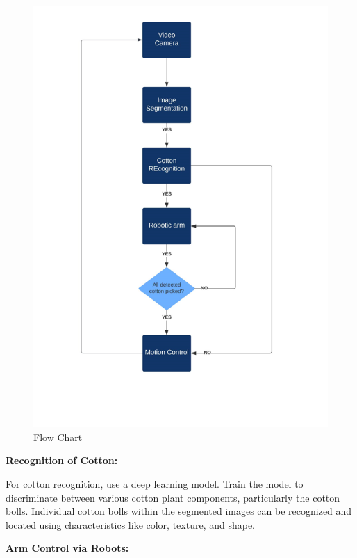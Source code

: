 \documentclass[12pt,a4paper]{report}
\begin{document}
\begin{figure}[!htb]
\begin{center}
\includegraphics[scale=0.8]{images/diagrams/flowchart.png}
\caption{Flow Chart}
\end{center}
\end{figure}

\newpage

\par {\bf{Recognition of Cotton:}}

For cotton recognition, use a deep learning model.
Train the model to discriminate between various cotton plant components, particularly the cotton bolls.
Individual cotton bolls within the segmented images can be recognized and located using characteristics like color, texture, and shape.
\par {\bf{Arm Control via Robots:}}
\end{document}
